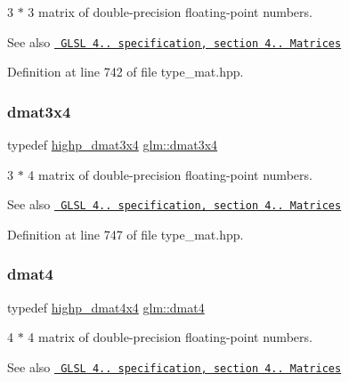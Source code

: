3 $\ast$ 3 matrix of double-\/precision floating-\/point numbers.

\begin{DoxySeeAlso}{See also}
\href{http://www.opengl.org/registry/doc/GLSLangSpec.4.20.8.pdf}{\texttt{ G\+L\+SL 4.. specification, section 4.. Matrices}} 
\end{DoxySeeAlso}


Definition at line 742 of file type\+\_\+mat.\+hpp.

\mbox{\label{group__core__types_ga19e745a83cba85f57afa1232276dcc96}} 
\subsubsection{\texorpdfstring{dmat3x4}{dmat3x4}}
{\footnotesize\ttfamily typedef \mbox{\hyperlink{group__core__precision_ga2f3cf8e3bd4ea0beeefe56b45b14118b}{highp\+\_\+dmat3x4}} \mbox{\hyperlink{group__core__types_ga19e745a83cba85f57afa1232276dcc96}{glm\+::dmat3x4}}}

3 $\ast$ 4 matrix of double-\/precision floating-\/point numbers.

\begin{DoxySeeAlso}{See also}
\href{http://www.opengl.org/registry/doc/GLSLangSpec.4.20.8.pdf}{\texttt{ G\+L\+SL 4.. specification, section 4.. Matrices}} 
\end{DoxySeeAlso}


Definition at line 747 of file type\+\_\+mat.\+hpp.

\mbox{\label{group__core__types_ga7f7c1300ebfd19d573e9deb1e8758b54}} 
\subsubsection{\texorpdfstring{dmat4}{dmat4}}
{\footnotesize\ttfamily typedef \mbox{\hyperlink{group__core__precision_ga46855bd8fdcb8dbc7db5d2aaeb91be69}{highp\+\_\+dmat4x4}} \mbox{\hyperlink{group__core__types_ga7f7c1300ebfd19d573e9deb1e8758b54}{glm\+::dmat4}}}

4 $\ast$ 4 matrix of double-\/precision floating-\/point numbers.

\begin{DoxySeeAlso}{See also}
\href{http://www.opengl.org/registry/doc/GLSLangSpec.4.20.8.pdf}{\texttt{ G\+L\+SL 4.. specification, section 4.. Matrices}} 
\end{DoxySeeAlso}


